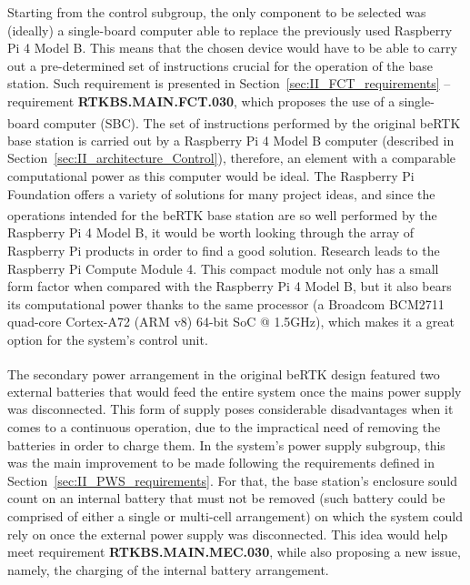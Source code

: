Starting from the control subgroup, the only component to be selected was (ideally) a single-board computer able to replace the previously used Raspberry Pi 4 Model B. This means that the chosen device would have to be able to carry out a pre-determined set of instructions crucial for the operation of the base station. Such requirement is presented in Section~\ref{sec:II_FCT_requirements} -- requirement \textbf{RTKBS.MAIN.FCT.030}, which proposes the use of a single-board computer (SBC). The set of instructions performed by the original beRTK\textsuperscript{\textregistered} base station is carried out by a Raspberry Pi 4 Model B computer (described in Section~\ref{sec:II_architecture_Control}), therefore, an element with a comparable computational power as this computer would be ideal. The Raspberry Pi Foundation offers a variety of solutions for many project ideas, and since the operations intended for the beRTK\textsuperscript{\textregistered} base station are so well performed by the Raspberry Pi 4 Model B, it would be worth looking through the array of Raspberry Pi products in order to find a good solution. Research leads to the Raspberry Pi Compute Module 4. This compact module not only has a small form factor when compared with the Raspberry Pi 4 Model B, but it also bears its computational power thanks to the same processor (a Broadcom BCM2711 quad-core Cortex-A72 (ARM v8) 64-bit SoC @ 1.5GHz), which makes it a great option for the system's control unit.




The secondary power arrangement in the original beRTK\textsuperscript{\textregistered} design featured two external batteries that would feed the entire system once the mains power supply was disconnected. This form of supply poses considerable disadvantages when it comes to a continuous operation, due to the impractical need of removing the batteries in order to charge them. In the system's power supply subgroup, this was the main improvement to be made following the requirements defined in Section~\ref{sec:II_PWS_requirements}. For that, the base station's enclosure sould count on an internal battery that must not be removed (such battery could be comprised of either a single or multi-cell arrangement) on which the system could rely on once the external power supply was disconnected. This idea would help meet requirement \textbf{RTKBS.MAIN.MEC.030}, while also proposing a new issue, namely, the charging of the internal battery arrangement.

